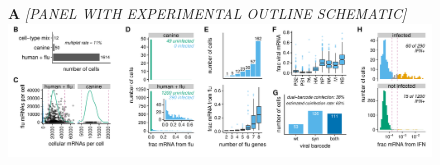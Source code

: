 \documentclass[9pt,lineno]{elife}
\newcommand{\jdbcomment}[1]{\emph{\color{red} [#1]}}
\begin{document}
\begin{figure}
\begin{fullwidth}

{\centering
{\bf A} \jdbcomment{PANEL WITH EXPERIMENTAL OUTLINE SCHEMATIC} \vspace{0.2in}\\

\includegraphics[width=\linewidth, clip=false]{figures/single_cell_figures/p_cell_summary.pdf}
}


\end{fullwidth}
\end{figure}
\end{document}

